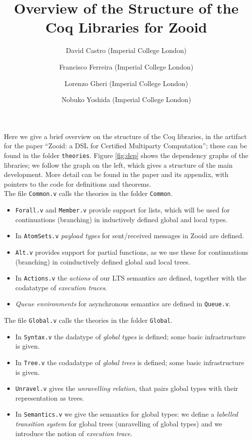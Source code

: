 \documentclass[11pt, a4paper,UKenglish,cleveref, autoref, thm-restate]{article}
\title{\bf Overview of the Structure of the Coq Libraries for Zooid}
\author{David Castro (Imperial College London) \and Francisco Ferreira (Imperial College London) \and Lorenzo Gheri (Imperial College London)\and Nobuko Yoshida (Imperial College London)}
\begin{document}
\maketitle



Here we give a brief overview on the structure of the Coq libraries, in the artifact for the paper ``Zooid: a DSL for Certified Multiparty Computation''; these can be found in the folder \texttt{theories}. Figure \ref{fig:dep} shows the dependency graphs of the libraries; we follow the graph on the left, which gives a structure of the main development. More detail can be found in the paper and its appendix, with pointers to the code for definitions and theorems.\\

The file \texttt{Common.v} calls the theories in the folder \texttt{Common}.
\begin{itemize}
\item \texttt{Forall.v} and \texttt{Member.v} provide support for lists, which will be used for continuations (branching) in inductively defined global and local types.
\item In \texttt{AtomSets.v} \emph{payload types} for sent/received messages in Zooid are defined.
\item \texttt{Alt.v} provides support for partial functions, as we use these for continuations (branching) in coinductively defined global and local trees.
\item In \texttt{Actions.v} the \emph{actions} of our LTS semantics are defined, together with the codatatype of \emph{execution traces}.
\item \emph{Queue environments} for asynchronous semantics are defined in \texttt{Queue.v}.
\end{itemize}

The file \texttt{Global.v} calls the theories in the folder \texttt{Global}.
\begin{itemize}
\item In \texttt{Syntax.v} the dadatype of \emph{global types} is defined; some basic infrastructure is given.
\item In \texttt{Tree.v} the codadatype of \emph{global trees} is defined; some basic infrastructure is given.
\item \texttt{Unravel.v} gives the \emph{unravelling relation}, that pairs global types with their representation as trees.
\item In \texttt{Semantics.v} we give the semantics for global types: we define a \emph{labelled transition system} for global trees (unravelling of global types) and we introduce the notion of \emph{execution trace}.
\end{itemize}
\end{document}
